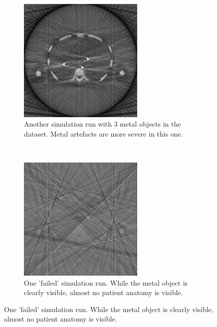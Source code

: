 \begin{figure}[h]
	\centering	
	\begin{subfigure}[h]{0.45\textwidth}
		\centering
		\includegraphics[height=6cm]{images/sim03.png}
		\caption{Another simulation run with 3 metal objects in the dataset. Metal artefacts are more severe in this one.}
		\label{sim03}
	\end{subfigure}%
	~
	\begin{subfigure}[h]{0.45\textwidth}
		\centering
		\includegraphics[height=6cm]{images/sim04.png}
		\caption{One 'failed' simulation run. While the metal object is clearly visible, almost no patient anatomy is visible.}
		\label{sim04}
	\end{subfigure}%
\end{figure}
